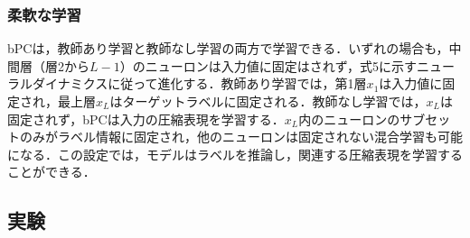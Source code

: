\documentclass[a4paper, titlepage]{jsarticle}
\begin{document}
\subsubsection{柔軟な学習}
bPCは，教師あり学習と教師なし学習の両方で学習できる．いずれの場合も，中間層（層2から$L-1$）のニューロンは入力値に固定はされず，式5に示すニューラルダイナミクスに従って進化する．教師あり学習では，第1層$x_1$は入力値に固定され，最上層$x_L$はターゲットラベルに固定される．教師なし学習では，$x_L$は固定されず，bPCは入力の圧縮表現を学習する．$x_L$内のニューロンのサブセットのみがラベル情報に固定され，他のニューロンは固定されない混合学習も可能になる．この設定では，モデルはラベルを推論し，関連する圧縮表現を学習することができる．
\subsection{実験}
\end{document}
